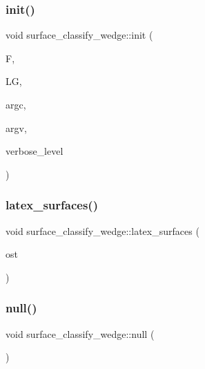 \mbox{\label{classsurface__classify__wedge_a43302106663b307aa8274a5112a7010a}} 
\subsubsection{\texorpdfstring{init()}{init()}}
{\footnotesize\ttfamily void surface\+\_\+classify\+\_\+wedge\+::init (\begin{DoxyParamCaption}\item[{\mbox{\hyperlink{classfinite__field}{finite\+\_\+field}} $\ast$}]{F,  }\item[{\mbox{\hyperlink{classlinear__group}{linear\+\_\+group}} $\ast$}]{LG,  }\item[{int}]{argc,  }\item[{const char $\ast$$\ast$}]{argv,  }\item[{\mbox{\hyperlink{galois_8h_a09fddde158a3a20bd2dcadb609de11dc}{I\+NT}}}]{verbose\+\_\+level }\end{DoxyParamCaption})}

\mbox{\label{classsurface__classify__wedge_aaf5b820bb9479f692eaf24c7a8691c12}} 
\subsubsection{\texorpdfstring{latex\+\_\+surfaces()}{latex\_surfaces()}}
{\footnotesize\ttfamily void surface\+\_\+classify\+\_\+wedge\+::latex\+\_\+surfaces (\begin{DoxyParamCaption}\item[{ostream \&}]{ost }\end{DoxyParamCaption})}

\mbox{\label{classsurface__classify__wedge_a0fd17ba8e9d3c3c9e72d9a934089c9c8}} 
\subsubsection{\texorpdfstring{null()}{null()}}
{\footnotesize\ttfamily void surface\+\_\+classify\+\_\+wedge\+::null (\begin{DoxyParamCaption}{ }\end{DoxyParamCaption})}


